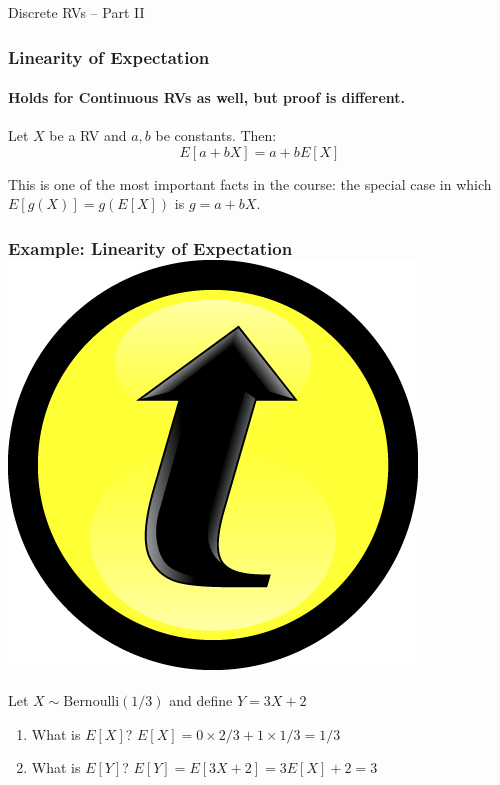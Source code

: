 \documentclass[handout]{beamer}
\date{Lecture \# 9}
\begin{document}
 


\begin{frame}[plain]
	\titlepage 
	

\end{frame} 


\begin{frame}
\centering \Huge Discrete RVs -- Part II

\end{frame}




\begin{frame}
\frametitle{Linearity of Expectation}
\framesubtitle{Holds for Continuous RVs as well, but proof is different.}
Let $X$ be a RV and $a,b$ be constants. Then:
	$$E[a + bX] = a + bE[X]$$
\vspace{2em}
\begin{alertblock}{This is one of the most important facts in the course: the special case in which $E[g(X)] = g(E[X])$ is $g = a+bX$.}
\end{alertblock}
\end{frame}
\begin{frame}
\frametitle{Example: Linearity of Expectation \hfill \includegraphics[scale = 0.05]{./images/clicker} }
Let $X \sim \mbox{Bernoulli}(1/3)$ and define $Y = 3X + 2$
\vspace{1em}

\begin{enumerate}
  \item What is $E[X]$? \pause \hspace{2em} \alert{$E[X] = 0 \times 2/3 + 1 \times 1/3 = 1/3$} \pause
  \item What is $E[Y]$? \pause \hspace{2em} \alert{$E[Y] = E[3X + 2] = 3E[X] + 2 = 3$}
\end{enumerate}
\end{frame}
\end{document}
